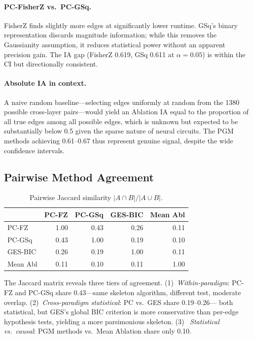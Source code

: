 \documentclass{article}
\begin{document}
\paragraph{PC-FisherZ vs.\ PC-GSq.}
FisherZ finds slightly more edges at significantly lower runtime. GSq's binary
representation discards magnitude information; while this removes the
Gaussianity assumption, it reduces statistical power without an apparent
precision gain. The IA gap (FisherZ 0.619, GSq 0.611 at $\alpha{=}0.05$)
is within the CI but directionally consistent.

\paragraph{Absolute IA in context.}
A naive random baseline---selecting edges uniformly at random from the 1380
possible cross-layer pairs---would yield an Ablation IA equal to the proportion
of all true edges among all possible edges, which is unknown but expected to
be substantially below 0.5 given the sparse nature of neural circuits.
The PGM methods achieving 0.61--0.67 thus represent genuine signal, despite
the wide confidence intervals.

\subsection{Pairwise Method Agreement}

\begin{table}[t]
\centering
\caption{Pairwise Jaccard similarity $|A \cap B| / |A \cup B|$.}
\label{tab:jaccard}
\small
\begin{tabular}{lrrrr}
\toprule
 & PC-FZ & PC-GSq & GES-BIC & Mean Abl \\
\midrule
PC-FZ    & 1.00 & 0.43 & 0.26 & 0.11 \\
PC-GSq   & 0.43 & 1.00 & 0.19 & 0.10 \\
GES-BIC  & 0.26 & 0.19 & 1.00 & 0.11 \\
Mean Abl & 0.11 & 0.10 & 0.11 & 1.00 \\
\bottomrule
\end{tabular}
\end{table}

The Jaccard matrix reveals three tiers of agreement. (1)~\emph{Within-paradigm}:
PC-FZ and PC-GSq share 0.43---same skeleton algorithm, different test, moderate
overlap. (2)~\emph{Cross-paradigm statistical}: PC vs.\ GES share 0.19--0.26---
both statistical, but GES's global BIC criterion is more conservative than
per-edge hypothesis tests, yielding a more parsimonious skeleton. (3)~\emph{
Statistical vs.\ causal}: PGM methods vs.\ Mean Ablation share only 0.10.
\end{document}
